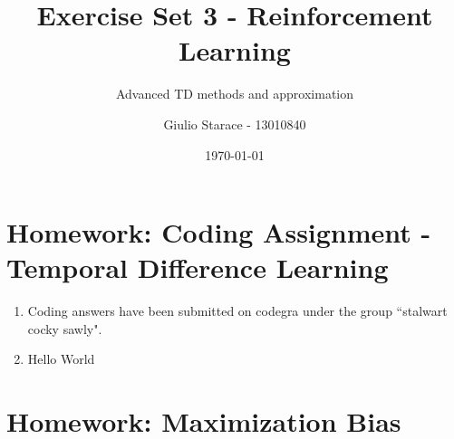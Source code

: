 \documentclass{article}
\title{Exercise Set 3 - Reinforcement Learning}
\subtitle{Advanced TD methods and approximation}
\author{Giulio Starace - 13010840}
\date{\today}
\begin{document}
\maketitle
\section*{Homework: Coding Assignment - Temporal Difference Learning}
\begin{enumerate}
	\item Coding answers have been submitted on codegra under the group ``stalwart cocky sawly".
	\item Hello World
\end{enumerate}

\section*{Homework: Maximization Bias}
\end{document}
